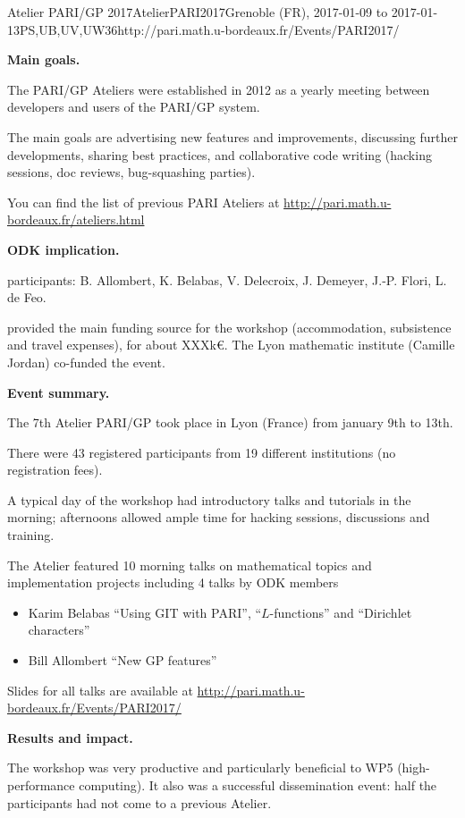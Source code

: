 \begin{event}{Atelier PARI/GP 2017}{AtelierPARI2017}{Grenoble (FR),
2017-01-09 to 2017-01-13}{PS,UB,UV,UW}{36}{http://pari.math.u-bordeaux.fr/Events/PARI2017/}

\textbf{Main goals.}

The PARI/GP Ateliers were established in 2012 as a yearly meeting
between developers and users of the PARI/GP system.

The main goals are advertising new features and improvements,
discussing further developments, sharing best practices, and collaborative
code writing (hacking sessions, doc reviews, bug-squashing parties).

You can find the list of previous PARI Ateliers at
\url{http://pari.math.u-bordeaux.fr/ateliers.html}

\textbf{ODK implication.} 

\ODK participants: B. Allombert, K. Belabas, V. Delecroix, J. Demeyer,
J.-P. Flori, L. de Feo.

\ODK provided the main funding source for the workshop (accommodation,
subsistence and travel expenses), for about XXXk\euro. The Lyon
mathematic institute (Camille Jordan) co-funded the event.

\textbf{Event summary.} 

The 7th Atelier PARI/GP took place in Lyon (France) from january
9th to 13th.

There were 43 registered participants from 19 different institutions
(no registration fees).

A typical day of the workshop had introductory talks and tutorials
in the morning; afternoons allowed ample time for hacking sessions,
discussions and training.

The Atelier featured 10 morning talks on mathematical topics and
implementation projects including 4 talks by ODK members
\begin{itemize}
\item Karim Belabas ``Using GIT with PARI'', ``$L$-functions'' and
  ``Dirichlet characters''
\item Bill Allombert ``New GP features''
\end{itemize}

Slides for all talks are available at
\url{http://pari.math.u-bordeaux.fr/Events/PARI2017/}

\textbf{Results and impact.} 

The workshop was very productive and particularly beneficial to WP5
(high-performance computing). It also was a successful dissemination event: half
  the participants had not come to a previous Atelier.

\end{event}

